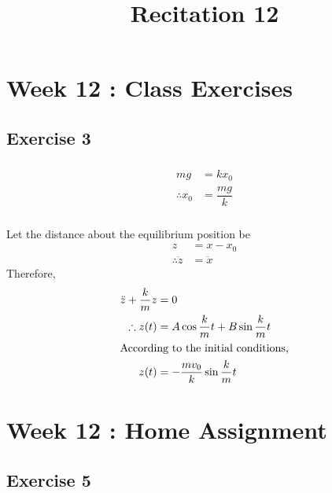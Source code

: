 \documentclass[fleqn, a4paper, 12pt]{article}
\title{Recitation 12}
\author{}
\date{\formatdate{14}{1}{2015}}
\theoremstyle{definition}
\theoremstyle{theorem}
\begin{document}
\maketitle


\section*{Week 12 : Class Exercises}

\subsection*{Exercise 3}

\subsubsection{}

\begin{align*}
	m g &= k x_0\\
	\therefore x_0 &= \dfrac{m g}{k}
\end{align*}

\subsubsection{}

Let the distance about the equilibrium position be
\begin{align*}
	z &= x - x_0\\
	\therefore \ddot{z} &= \ddot{x}
\end{align*}
Therefore,
\begin{align*}
	\ddot{z} + \dfrac{k}{m} z &= 0\\
	\therefore z(t) &= A \cos \dfrac{k}{m} t + B \sin \dfrac{k}{m} t\\
	\intertext{According to the initial conditions,}
	z(t) &= -\dfrac{m v_0}{k} \sin \dfrac{k}{m} t
\end{align*}

\section*{Week 12 : Home Assignment}

\subsection*{Exercise 5}
\end{document}
